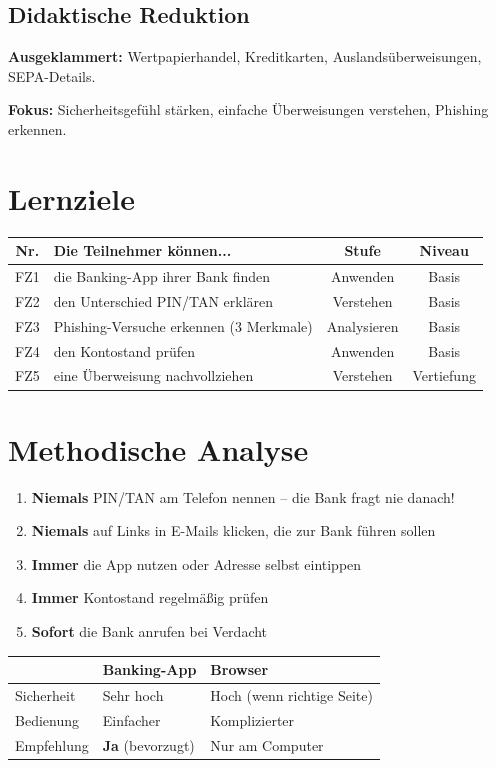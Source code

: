 \documentclass[11pt,a4paper]{article}
\begin{document}
\subsection{Didaktische Reduktion}
\textbf{Ausgeklammert:} Wertpapierhandel, Kreditkarten, Auslandsüberweisungen, SEPA-Details.

\textbf{Fokus:} Sicherheitsgefühl stärken, einfache Überweisungen verstehen, Phishing erkennen.

\section{Lernziele}

\begin{tabular}{|c|p{7cm}|c|c|}
\hline
\textbf{Nr.} & \textbf{Die Teilnehmer können...} & \textbf{Stufe} & \textbf{Niveau} \\
\hline
FZ1 & die Banking-App ihrer Bank finden & Anwenden & Basis \\
FZ2 & den Unterschied PIN/TAN erklären & Verstehen & Basis \\
FZ3 & Phishing-Versuche erkennen (3 Merkmale) & Analysieren & Basis \\
FZ4 & den Kontostand prüfen & Anwenden & Basis \\
FZ5 & eine Überweisung nachvollziehen & Verstehen & Vertiefung \\
\hline
\end{tabular}

\section{Methodische Analyse}

\begin{warnbox}
\begin{enumerate}
    \item \textbf{Niemals} PIN/TAN am Telefon nennen -- die Bank fragt nie danach!
    \item \textbf{Niemals} auf Links in E-Mails klicken, die zur Bank führen sollen
    \item \textbf{Immer} die App nutzen oder Adresse selbst eintippen
    \item \textbf{Immer} Kontostand regelmäßig prüfen
    \item \textbf{Sofort} die Bank anrufen bei Verdacht
\end{enumerate}
\end{warnbox}

\begin{infobox}
\begin{tabular}{|l|l|l|}
\hline
& \textbf{Banking-App} & \textbf{Browser} \\
\hline
Sicherheit & Sehr hoch & Hoch (wenn richtige Seite) \\
Bedienung & Einfacher & Komplizierter \\
Empfehlung & \textbf{Ja} (bevorzugt) & Nur am Computer \\
\hline
\end{tabular}
\end{infobox}
\end{document}
